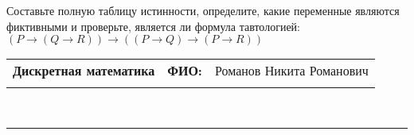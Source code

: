 \documentclass[10pt]{exam}
\newcommand{\class}{Дискретная математика}
\newcommand{\examdate}{}
\begin{document}
\begin{questions}
\begin{enumerate}[a)]
\end{enumerate}\question Составьте полную таблицу истинности, определите, какие переменные являются фиктивными и проверьте, является ли формула тавтологией:
$(P \rightarrow (Q \rightarrow R)) \rightarrow ((P \rightarrow Q) \rightarrow (P \rightarrow R))$

\end{questions}
\newpage
\begin{flushright}
\begin{tabular}{p{2.8in} r l}
\textbf{\class} & \textbf{ФИО:} &Романов Никита Романович
\\

\textbf{\examdate} &&\\
\end{tabular}\\
\end{flushright}
\rule[1ex]{\textwidth}{.1pt}
\end{document}
